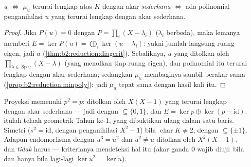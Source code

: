 \begin{corollary}\label{cor:b2:reduction:minpolycrit}
$u$  $\iff$ $\mu_u$ terurai lengkap atas $K$ dengan
akar \emph{sederhana} $\iff$ ada polinomial penganihilasi $u$ yang
terurai lengkap dengan akar sederhana.
\end{corollary}

\begin{proof}
Jika $P(u) = 0$ dengan $P = \prod_{i}(X - \lambda_i)$ ($\lambda_i$
berbeda), maka lemanya memberi $E = \ker P(u) = \bigoplus_i \ker(u -
\lambda_i)$: yakni jumlah langsung ruang eigen, jadi $u$  (\cref{thm:b2:reduction:diagcrit}). Sebaliknya, $u$ yang
 ditolkan oleh $\prod_{\lambda \in \operatorname{Sp}u}(X -
\lambda)$ (yang menolkan tiap ruang eigen), dan polinomial itu terurai
lengkap dengan akar sederhana; sedangkan $\mu_u$ membaginya sambil
berakar sama (\cref{prop:b2:reduction:minpoly}): jadi $\mu_u$ tepat sama
dengan hasil kali itu.
\end{proof}

\begin{example}\label{ex:b2:reduction:projections}
Proyeksi memenuhi $p^2 = p$: ditolkan oleh $X(X-1)$ yang terurai lengkap
dengan akar sederhana --- jadi  dengan 
$\subseteq \{0, 1\}$, dan $E = \ker p \oplus \ker(p - \mathrm{id})$:
itulah telaah geometrik Tahun ke-1, yang dibuktikan ulang dalam satu
baris. Simetri ($s^2 = \mathrm{id}$, dengan penganihilasi $X^2 - 1$)
 bila $\operatorname{char} K \neq 2$, dengan 
$\subseteq \{\pm 1\}$. Adapun endomorfisma dengan $u^3 = u^2$ dan $u^2
\neq u$ ditolkan oleh $X^2(X - 1)$, dan \emph{tidak} harus  --- kriterianya mendeteksi hal itu (akar ganda $0$ wajib
diuji:  bila dan hanya bila lagi-lagi $\ker u^2 = \ker u$).
\end{example}

